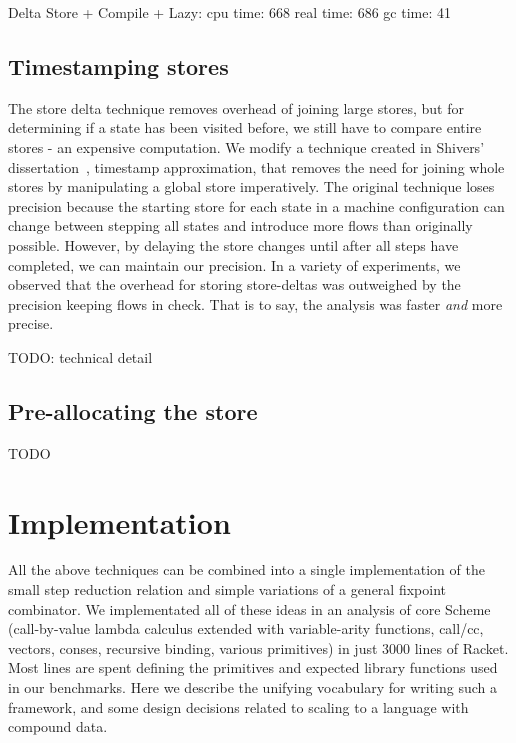 \documentclass[preprint,onecolumn,9pt]{sigplanconf} %
\begin{document}
Delta Store + Compile + Lazy:
   cpu time: 668 real time: 686 gc time: 41

\subsection{Timestamping stores}

The store delta technique removes overhead of joining large stores,
but for determining if a state has been visited before, we still have
to compare entire stores - an expensive computation.  We modify a
technique created in Shivers'
dissertation~\cite{ianjohnson:Shivers:1991:CFA}, timestamp
approximation, that removes the need for joining whole stores by
manipulating a global store imperatively. The original technique loses
precision because the starting store for each state in a machine
configuration can change between stepping all states and introduce
more flows than originally possible. However, by delaying the store
changes until after all steps have completed, we can maintain our
precision. In a variety of experiments, we observed that the overhead
for storing store-deltas was outweighed by the precision keeping flows
in check. That is to say, the analysis was faster {\it and} more precise.

TODO: technical detail

\subsection{Pre-allocating the store}
TODO

\section{Implementation}
\label{sec:impl}

All the above techniques can be combined into a single implementation
of the small step reduction relation and simple variations of a
general fixpoint combinator. We implementated all of these ideas in an
analysis of core Scheme (call-by-value lambda calculus extended with
variable-arity functions, call/cc, vectors, conses, recursive binding,
various primitives) in just 3000 lines of Racket. Most lines are spent
defining the primitives and expected library functions used in our
benchmarks. Here we describe the unifying vocabulary for writing such
a framework, and some design decisions related to scaling to a
language with compound data.
\end{document}
